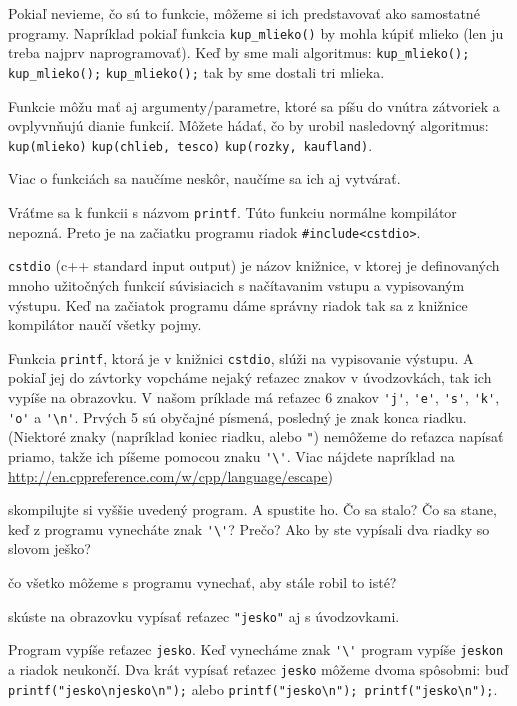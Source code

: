 \medskip

Pokiaľ nevieme, čo sú to funkcie, môžeme si ich predstavovať ako samostatné programy. Napríklad pokiaľ
funkcia \verb!kup_mlieko()! by mohla kúpiť mlieko (len ju treba najprv naprogramovať). Keď by sme mali algoritmus:
\verb!kup_mlieko();! \verb!kup_mlieko();! \verb!kup_mlieko();! tak by sme dostali tri mlieka. 

Funkcie môžu mať aj argumenty/parametre, ktoré sa píšu do vnútra zátvoriek a ovplyvnňujú dianie funkcií. Môžete hádať, čo 
by urobil nasledovný algoritmus: \verb!kup(mlieko)! \verb!kup(chlieb, tesco)! \verb!kup(rozky, kaufland)!.

Viac o funkciách sa naučíme neskôr, naučíme sa ich aj vytvárať.

\medskip

Vráťme sa k funkcii s názvom \verb!printf!. Túto funkciu normálne kompilátor nepozná.
Preto je na začiatku programu riadok \verb!#include<cstdio>!.

\verb!cstdio! (c++ standard input output) je názov knižnice, v ktorej je definovaných mnoho užitočných funkcií
súvisiacich s načítavanim vstupu a vypisovaným výstupu. Keď na začiatok programu dáme správny riadok
tak sa z knižnice kompilátor naučí všetky pojmy.

Funkcia \verb!printf!, ktorá je v knižnici \verb!cstdio!, slúži na vypisovanie výstupu.
A pokiaľ jej do závtorky vopcháme nejaký reťazec znakov v úvodzovkách, tak ich vypíše na obrazovku.
V našom príklade má reťazec 6 znakov \verb!'j'!, \verb!'e'!, \verb!'s'!, \verb!'k'!, \verb!'o'! a \verb!'\n'!. 
Prvých 5 sú obyčajné písmená, posledný je znak konca riadku. (Niektoré znaky (napríklad koniec riadku, alebo \verb!"!) 
nemôžeme do reťazca napísať priamo, takže ich píšeme pomocou znaku \verb!'\'!. Viac nájdete napríklad na 
\url{http://en.cppreference.com/w/cpp/language/escape})

\medskip

 skompilujte si vyššie uvedený program. A spustite ho. Čo sa stalo? Čo sa stane, keď z programu vynecháte znak \verb!'\'!? Prečo?
Ako by ste vypísali dva riadky so slovom ješko?

 čo všetko môžeme s programu vynechať, aby stále robil to isté?

 skúste na obrazovku vypísať reťazec \verb!"jesko"! aj s úvodzovkami.

 Program vypíše reťazec \verb"jesko". Keď vynecháme znak \verb!'\'! program vypíše \verb"jeskon" a riadok neukončí.
Dva krát vypísať reťazec \verb"jesko" môžeme dvoma spôsobmi: buď \verb!printf("jesko\njesko\n");! alebo \verb!printf("jesko\n"); printf("jesko\n");!.

